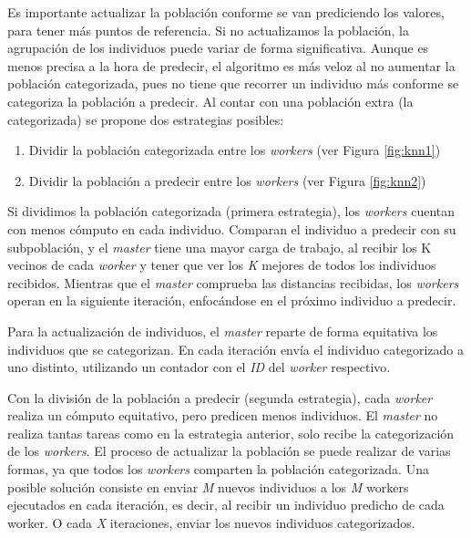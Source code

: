 		Es importante actualizar la población conforme se van prediciendo los valores, para tener más puntos de referencia. Si no actualizamos la población, la agrupación de los individuos puede variar de forma significativa. Aunque es menos precisa a la hora de predecir, el algoritmo es más veloz al no aumentar la población categorizada, pues no tiene que recorrer un individuo más conforme se categoriza la población a predecir. Al contar con una población extra (la categorizada) se propone dos estrategias posibles:
		
		
		\begin{enumerate}
			\item Dividir la población categorizada entre los \textit{workers} (ver Figura \ref{fig:knn1})
			\item Dividir la población a predecir entre los \textit{workers} (ver Figura \ref{fig:knn2})
		\end{enumerate}
		
		Si dividimos la población categorizada (primera estrategia), los \textit{workers} cuentan con menos cómputo en cada individuo. Comparan el individuo a predecir con su subpoblación, y el \textit{master} tiene una mayor carga de trabajo, al recibir los K vecinos de cada \textit{worker} y tener que ver los \textit{K} mejores de todos los individuos recibidos.  Mientras que el \textit{master} comprueba las distancias recibidas, los \textit{workers} operan en la siguiente iteración, enfocándose en el próximo individuo a predecir. 
		
		Para la actualización de individuos, el \textit{master} reparte de forma equitativa los individuos que se categorizan. En cada iteración envía el individuo categorizado a uno distinto, utilizando un contador con el \textit{ID} del \textit{worker} respectivo.
		
		Con la división de la población a predecir (segunda estrategia), cada \textit{worker} realiza un cómputo equitativo, pero predicen menos individuos. El \textit{master} no realiza tantas tareas como en la estrategia anterior, solo recibe la categorización de los \textit{workers}. El proceso de actualizar la población se puede realizar de varias formas, ya que todos los \textit{workers} comparten la población categorizada. Una posible solución consiste en enviar \textit{M} nuevos individuos a los \textit{M} workers ejecutados en cada iteración, es decir, al recibir un individuo predicho de cada worker. O cada \textit{X} iteraciones, enviar los nuevos individuos categorizados.
		
